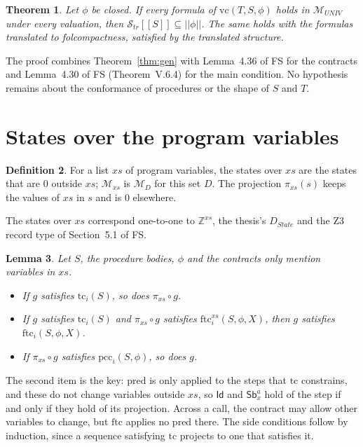 \documentclass[11pt]{article}
\newcommand{\sem}[1]{[\![ #1 ]\!]}
\newcommand{\fsem}[1]{|\!|#1|\!|}
\newcommand{\Str}{{\mathcal{S}_{\mathit{tr}}}}
\newcommand{\Id}{\mathsf{Id}}
\newcommand{\Sb}[2]{\mathsf{Sb}^{#1}_{#2}}
\newcommand{\State}{\mathit{State}}
\newcommand{\tc}{\mathrm{tc}}
\newcommand{\ftc}{\mathrm{ftc}}
\newcommand{\pred}{\mathrm{pred}}
\newcommand{\pcc}{\mathrm{pcc}}
\newcommand{\proj}{\pi}
\newcommand{\vc}{\mathrm{vc}}
\newcommand{\M}{\mathcal{M}}
\newcommand{\Z}{\mathbb{Z}}
\newcommand{\Th}[1]{#1 of FS}
\theoremstyle{plain}
\newtheorem{theorem}{Theorem}[section]
\newtheorem{lemma}[theorem]{Lemma}
\theoremstyle{definition}
\newtheorem{definition}[theorem]{Definition}
\theoremstyle{remark}
\begin{document}
\begin{theorem}\label{thm:e2e}
  Let $\phi$ be closed. If every formula of $\vc(T, S, \phi)$ holds in
  $\M_{\mathit{UNIV}}$ under every valuation, then $\Str\sem{S} \subseteq
  \fsem{\phi}$. The same holds with the formulas translated to
  folcompactness, satisfied by the translated structure.
\end{theorem}

The proof combines Theorem~\ref{thm:gen} with \Th{Lemma~4.36} for the
contracts and \Th{Lemma~4.30} (Theorem~V.6.4) for the main condition. No
hypothesis remains about the conformance of procedures or the shape of
$S$ and $T$.

\section{States over the program variables}\label{sec:xs}

\begin{definition}\label{def:xs}
  For a list $xs$ of program variables, the states over $xs$ are the
  states that are $0$ outside $xs$; $\M_{xs}$ is $\M_D$ for this set $D$.
  The projection $\proj_{xs}(s)$ keeps the values of $xs$ in $s$ and is
  $0$ elsewhere.
\end{definition}

The states over $xs$ correspond one-to-one to $\Z^{xs}$, the thesis's
$D_{\State}$ and the Z3 record type of \Th{Section~5.1}.

\begin{lemma}\label{lem:proj}
  Let $S$, the procedure bodies, $\phi$ and the contracts only mention
  variables in $xs$.
  \begin{itemize}
  \item If $g$ satisfies $\tc_i(S)$, so does $\proj_{xs} \circ g$.
  \item If $g$ satisfies $\tc_i(S)$ and $\proj_{xs} \circ g$ satisfies
    $\ftc^{xs}_i(S, \phi, X)$, then $g$ satisfies $\ftc_i(S, \phi, X)$.
  \item If $\proj_{xs} \circ g$ satisfies $\pcc_i(S, \phi)$, so does $g$.
  \end{itemize}
\end{lemma}

The second item is the key: $\pred$ is only applied to the steps that
$\tc$ constrains, and these do not change variables outside $xs$, so
$\Id$ and $\Sb{a}{x}$ hold of the step if and only if they hold of its
projection. Across a call, the contract may allow other variables to
change, but $\ftc$ applies no $\pred$ there. The side conditions follow by
induction, since a sequence satisfying $\tc$ projects to one that
satisfies it.
\end{document}
